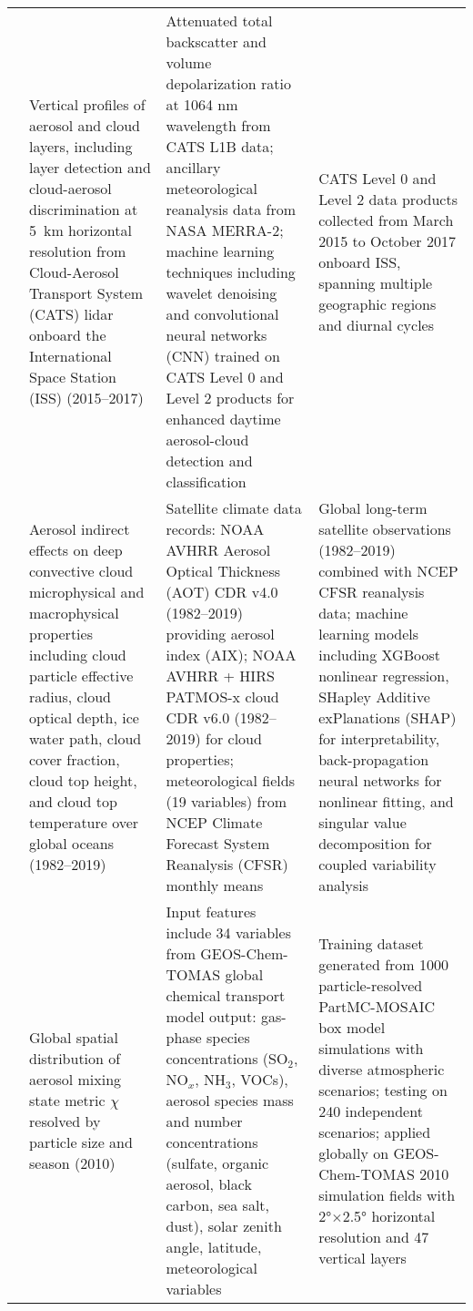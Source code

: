 \documentclass[11pt]{article}
\begin{document}
\begin{landscape}
\begin{longtable}{>{\raggedright\arraybackslash}p{2cm} 
        >{\raggedright\arraybackslash}p{4cm} 
        >{\raggedright\arraybackslash}p{10cm} 
        >{\raggedright\arraybackslash}p{6cm}}
\citet{yorks2021aerosol} & Vertical profiles of aerosol and cloud layers, including layer detection and cloud-aerosol discrimination at 5~km horizontal resolution from Cloud-Aerosol Transport System (CATS) lidar onboard the International Space Station (ISS) (2015–2017) & Attenuated total backscatter and volume depolarization ratio at 1064 nm wavelength from CATS L1B data; ancillary meteorological reanalysis data from NASA MERRA-2; machine learning techniques including wavelet denoising and convolutional neural networks (CNN) trained on CATS Level 0 and Level 2 products for enhanced daytime aerosol-cloud detection and classification & CATS Level 0 and Level 2 data products collected from March 2015 to October 2017 onboard ISS, spanning multiple geographic regions and diurnal cycles \\[6pt]

\citet{zhao2024studying} & Aerosol indirect effects on deep convective cloud microphysical and macrophysical properties including cloud particle effective radius, cloud optical depth, ice water path, cloud cover fraction, cloud top height, and cloud top temperature over global oceans (1982–2019) & Satellite climate data records: NOAA AVHRR Aerosol Optical Thickness (AOT) CDR v4.0 (1982–2019) providing aerosol index (AIX); NOAA AVHRR + HIRS PATMOS-x cloud CDR v6.0 (1982–2019) for cloud properties; meteorological fields (19 variables) from NCEP Climate Forecast System Reanalysis (CFSR) monthly means & Global long-term satellite observations (1982–2019) combined with NCEP CFSR reanalysis data; machine learning models including XGBoost nonlinear regression, SHapley Additive exPlanations (SHAP) for interpretability, back-propagation neural networks for nonlinear fitting, and singular value decomposition for coupled variability analysis \\[6pt]

\citet{hughes2018machine} & Global spatial distribution of aerosol mixing state metric \(\chi\) resolved by particle size and season (2010) & Input features include 34 variables from GEOS-Chem-TOMAS global chemical transport model output: gas-phase species concentrations (SO$_2$, NO$_x$, NH$_3$, VOCs), aerosol species mass and number concentrations (sulfate, organic aerosol, black carbon, sea salt, dust), solar zenith angle, latitude, meteorological variables & Training dataset generated from 1000 particle-resolved PartMC-MOSAIC box model simulations with diverse atmospheric scenarios; testing on 240 independent scenarios; applied globally on GEOS-Chem-TOMAS 2010 simulation fields with 2°$\times$2.5° horizontal resolution and 47 vertical layers \\[6pt]


\end{longtable}
\end{landscape}
\end{document}
